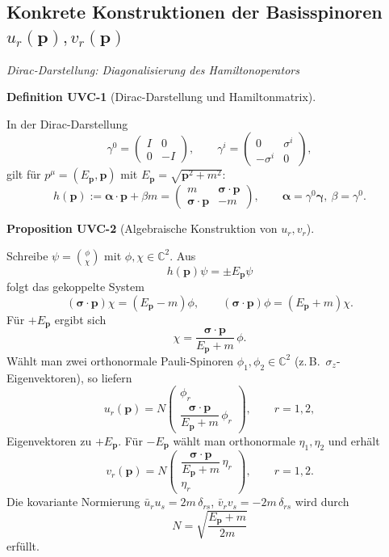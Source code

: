 \documentclass[10pt, letterpaper]{article}
\newcommand{\C}{\mathbb{C}}
\newcommand{\CustomHeading}[3]{%
  \par\medskip\noindent%
  \textbf{#1 #2} \textnormal{(#3)}.\enskip%
}
\newenvironment{DEF}[2]{\begin{unitbox}\CustomHeading{Definition}{#1}{#2}}{\end{unitbox}}
\newenvironment{PROP}[2]{\begin{unitbox}\CustomHeading{Proposition}{#1}{#2}}{\end{unitbox}}
\begin{document}
\subsection{Konkrete Konstruktionen der Basisspinoren \texorpdfstring{$u_r(\mathbf p),v_r(\mathbf p)$}{u,v}}

\emph{Dirac-Darstellung: Diagonalisierung des Hamiltonoperators}

\begin{DEF}{UVC-1}{Dirac-Darstellung und Hamiltonmatrix}
In der Dirac-Darstellung
\[
\gamma^0=\begin{pmatrix}I&0\\[2pt]0&-I\end{pmatrix},\qquad
\gamma^i=\begin{pmatrix}0&\sigma^i\\[2pt]-\sigma^i&0\end{pmatrix},
\]
gilt für $p^\mu=(E_{\mathbf p},\mathbf p)$ mit $E_{\mathbf p}=\sqrt{\mathbf p^2+m^2}$:
\[
h(\mathbf p):=\boldsymbol\alpha\cdot\mathbf p+\beta m
=\begin{pmatrix}m&\boldsymbol\sigma\!\cdot\!\mathbf p\\[2pt]\boldsymbol\sigma\!\cdot\!\mathbf p&-m\end{pmatrix},\qquad
\boldsymbol\alpha=\gamma^0\boldsymbol\gamma,\ \beta=\gamma^0.
\]
\end{DEF}

\begin{PROP}{UVC-2}{Algebraische Konstruktion von $u_r,v_r$}
Schreibe $\psi=\binom{\phi}{\chi}$ mit $\phi,\chi\in\C^2$. Aus
\[
h(\mathbf p)\psi=\pm E_{\mathbf p}\psi
\]
folgt das gekoppelte System
\[
(\boldsymbol\sigma\!\cdot\!\mathbf p)\chi=(E_{\mathbf p}-m)\phi,\qquad
(\boldsymbol\sigma\!\cdot\!\mathbf p)\phi=(E_{\mathbf p}+m)\chi.
\]
Für $+E_{\mathbf p}$ ergibt sich
\[
\chi=\frac{\boldsymbol\sigma\!\cdot\!\mathbf p}{E_{\mathbf p}+m}\,\phi.
\]
Wählt man zwei orthonormale Pauli-Spinoren $\phi_1,\phi_2\in\C^2$ (z.\,B.\ $\sigma_z$-Eigenvektoren), so liefern
\[
u_r(\mathbf p)=N\begin{pmatrix}
\phi_r\\[6pt]\dfrac{\boldsymbol\sigma\!\cdot\!\mathbf p}{E_{\mathbf p}+m}\,\phi_r
\end{pmatrix},\qquad r=1,2,
\]
Eigenvektoren zu $+E_{\mathbf p}$. Für $-E_{\mathbf p}$ wählt man orthonormale $\eta_1,\eta_2$ und erhält
\[
v_r(\mathbf p)=N\begin{pmatrix}
\dfrac{\boldsymbol\sigma\!\cdot\!\mathbf p}{E_{\mathbf p}+m}\,\eta_r\\[6pt]\eta_r
\end{pmatrix},\qquad r=1,2.
\]
Die kovariante Normierung $\bar u_r u_s=2m\,\delta_{rs}$, $\bar v_r v_s=-2m\,\delta_{rs}$ wird durch
\[
N=\sqrt{\frac{E_{\mathbf p}+m}{2m}}
\]
erfüllt.
\end{PROP}
\end{document}
